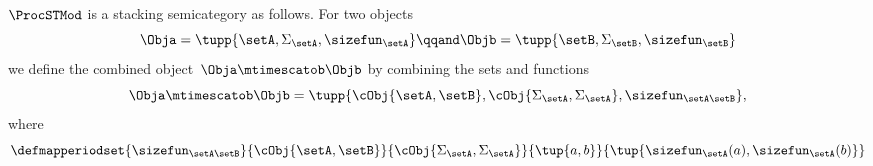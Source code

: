 \begin{lemma}\label{lem:ProcSTMod-stacking}
    $\ProcSTMod$ is a stacking semicategory as follows.
    For two objects
    \begin{equation}
        \Obja = \tupp{\setA, \Sigma_{\setA}, \sizefun_{\setA}}
        \qqand
        \Objb = \tupp{\setB, \Sigma_{\setB}, \sizefun_{\setB}}
    \end{equation}
    we define the combined object~$\Obja \mtimescatob \Objb$ by combining the sets and functions
    \begin{equation}
        \Obja \mtimescatob \Objb = \tupp{
            \cObj {\setA ,\setB},
            \cObj {\Sigma_{\setA}, \Sigma_{\setA}},
            \sizefun_{\setA\setB}
        },
    \end{equation}
    where
    \begin{equation}
        \defmapperiodset{
            \sizefun_{\setA\setB}
        }{
            \cObj {\setA , \setB}
        }{
            \cObj {\Sigma_{\setA}, \Sigma_{\setA}}
        }{
            \tup{a,b}
        }{
            \tup{
                \sizefun_{\setA}(a),
                \sizefun_{\setA}(b)
            }
        }
    \end{equation}


\end{lemma}
